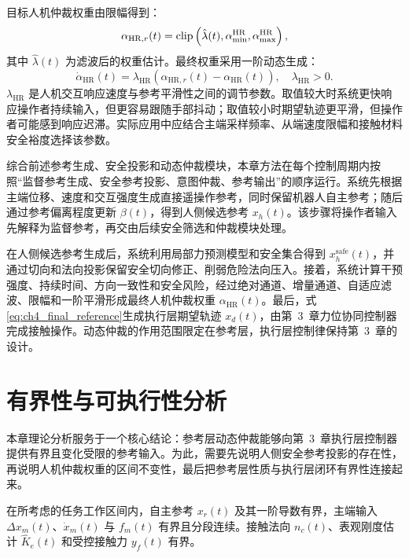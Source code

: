 目标人机仲裁权重由限幅得到：
\begin{equation}
  \alpha_{\mathrm{HR},r}(t)=
  \operatorname{clip}\left(\hat\lambda(t),\alpha_{\min}^{\mathrm{HR}},\alpha_{\max}^{\mathrm{HR}}\right),
  \label{eq:ch4_alpha_hr_target}
\end{equation}
其中 $\hat\lambda(t)$ 为滤波后的权重估计。最终权重采用一阶动态生成：
\begin{equation}
  \dot\alpha_{\mathrm{HR}}(t)=
  \lambda_{\mathrm{HR}}\left(
  \alpha_{\mathrm{HR},r}(t)-\alpha_{\mathrm{HR}}(t)
  \right),
  \quad \lambda_{\mathrm{HR}}>0 .
  \label{eq:ch4_alpha_hr_filter}
\end{equation}
$\lambda_{\mathrm{HR}}$ 是人机交互响应速度与参考平滑性之间的调节参数。取值较大时系统更快响应操作者持续输入，但更容易跟随手部抖动；取值较小时期望轨迹更平滑，但操作者可能感到响应迟滞。实际应用中应结合主端采样频率、从端速度限幅和接触材料安全裕度选择该参数。

综合前述参考生成、安全投影和动态仲裁模块，本章方法在每个控制周期内按照“监督参考生成、安全参考投影、意图仲裁、参考输出”的顺序运行。系统先根据主端位移、速度和交互强度生成直接遥操作参考，同时保留机器人自主参考；随后通过参考偏离程度更新 $\beta(t)$，得到人侧候选参考 $x_h(t)$。该步骤将操作者输入先解释为监督参考，再交由后续安全筛选和仲裁模块处理。

在人侧候选参考生成后，系统利用局部力预测模型和安全集合得到 $x_h^{\mathrm{safe}}(t)$，并通过切向和法向投影保留安全切向修正、削弱危险法向压入。接着，系统计算干预强度、持续时间、方向一致性和安全风险，经过绝对通道、增量通道、自适应滤波、限幅和一阶平滑形成最终人机仲裁权重 $\alpha_{\mathrm{HR}}(t)$。最后，式\eqref{eq:ch4_final_reference}生成执行层期望轨迹 $x_d(t)$，由第~3~章力位协同控制器完成接触操作。动态仲裁的作用范围限定在参考层，执行层控制律保持第~3~章的设计。

\section{有界性与可执行性分析}
\label{sec:ch4_boundedness}

本章理论分析服务于一个核心结论：参考层动态仲裁能够向第~3~章执行层控制器提供有界且变化受限的参考输入。为此，需要先说明人侧安全参考投影的存在性，再说明人机仲裁权重的区间不变性，最后把参考层性质与执行层闭环有界性连接起来。

\begin{assumption}[人类输入与自主参考有界]
\label{ass:ch4_input_bounded}
在所考虑的任务工作区间内，自主参考 $x_r(t)$ 及其一阶导数有界，主端输入 $\Delta x_m(t)$、$\dot x_m(t)$ 与 $f_m(t)$ 有界且分段连续。接触法向 $n_c(t)$、表观刚度估计 $\hat K_e(t)$ 和受控接触力 $y_f(t)$ 有界。
\end{assumption}

